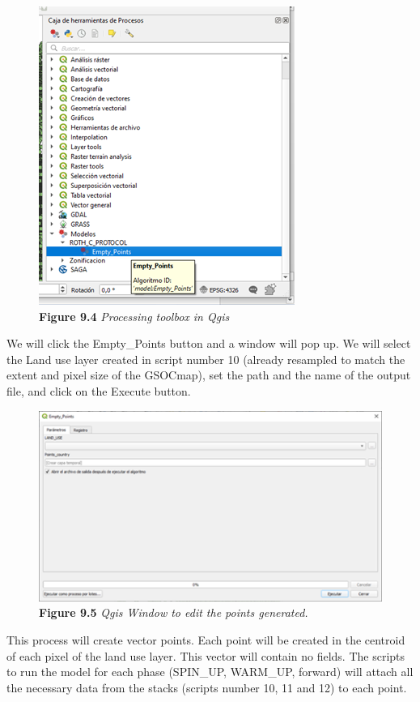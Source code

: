 \documentclass[
  10pt,
  b5paper,
]{book}
\begin{document}
\begin{figure}
\centering
\includegraphics{images/Figure_9.4.png}
\caption{\textbf{Figure 9.4} \emph{Processing toolbox in Qgis}}
\end{figure}

We will click the Empty\_Points button and a window will pop up. We will select the Land use layer created in script number 10 (already resampled to match the extent and pixel size of the GSOCmap), set the path and the name of the output file, and click on the Execute button.

\begin{figure}
\centering
\includegraphics{images/Figure_9.5.png}
\caption{\textbf{Figure 9.5} \emph{Qgis Window to edit the points generated.}}
\end{figure}

This process will create vector points. Each point will be created in the centroid of each pixel of the land use layer. This vector will contain no fields. The scripts to run the model for each phase (SPIN\_UP, WARM\_UP, forward) will attach all the necessary data from the stacks (scripts number 10, 11 and 12) to each point.
\end{document}
